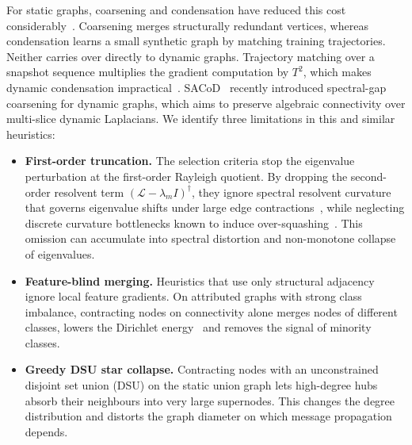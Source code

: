 \documentclass[sigconf]{acmart}
\begin{document}
For static graphs, coarsening and condensation have reduced this cost considerably~\cite{jin2021graph,liu2022graph,loukas2019graph,loukas2020survey,zheng2023structure}. Coarsening merges structurally redundant vertices, whereas condensation learns a small synthetic graph by matching training trajectories. Neither carries over directly to dynamic graphs. Trajectory matching over a snapshot sequence multiplies the gradient computation by $T^2$, which makes dynamic condensation impractical~\cite{jin2021graph,liu2024gcore}. SACoD~\cite{sacod2026} recently introduced spectral-gap coarsening for dynamic graphs, which aims to preserve algebraic connectivity over multi-slice dynamic Laplacians. We identify three limitations in this and similar heuristics:
\begin{itemize}
    \item \textbf{First-order truncation.} The selection criteria stop the eigenvalue perturbation at the first-order Rayleigh quotient. By dropping the second-order resolvent term $(\mathcal{L} - \lambda_m I)^\dagger$, they ignore spectral resolvent curvature that governs eigenvalue shifts under large edge contractions~\cite{sacod2026}, while neglecting discrete curvature bottlenecks known to induce over-squashing~\cite{topping2022understanding}. This omission can accumulate into spectral distortion and non-monotone collapse of eigenvalues.
    \item \textbf{Feature-blind merging.} Heuristics that use only structural adjacency ignore local feature gradients. On attributed graphs with strong class imbalance, contracting nodes on connectivity alone merges nodes of different classes, lowers the Dirichlet energy~\cite{chamberlain2021grand,digiovanni2023oversquashing,rusch2023survey} and removes the signal of minority classes.
    \item \textbf{Greedy DSU star collapse.} Contracting nodes with an unconstrained disjoint set union (DSU) on the static union graph lets high-degree hubs absorb their neighbours into very large supernodes. This changes the degree distribution and distorts the graph diameter on which message propagation depends.
\end{itemize}
\end{document}
